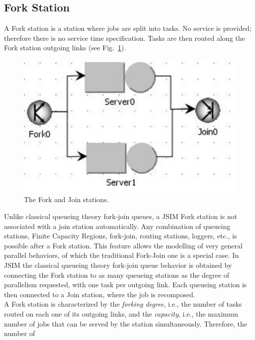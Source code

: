 \subsection{Fork Station}
\label{fstlab}
 A Fork station is a station where jobs
are split into tasks. No service is provided; therefore there is
no service time specification. Tasks are then routed along the
Fork station outgoing links (see Fig.~\ref{fig:forkprop}).\\
\begin{figure}[htb]
    \begin{center}
        \includegraphics[scale=.5]{img/jsimg/8.23.eps}
    \end{center}
    \caption{The Fork and Join stations.}
    \label{fig:forkprop}
\end{figure}
Unlike classical queueing theory fork-join queues, a JSIM Fork
station is not associated with a join station automatically. Any
combination of queueing stations, Finite Capacity Regions,
fork-join, routing stations, loggers, etc., is possible after a
Fork station. This feature allows the modelling of very general
parallel behaviors, of which the traditional Fork-Join one is a
special case. In JSIM the classical queueing theory fork-join
queue behavior is obtained by connecting the Fork station to as
many queueing stations as the degree of parallelism requested,
with one task per outgoing link. Each queueing station is then
connected to a Join station, where the job is recomposed.\\ A Fork
station is characterized by the \emph{forking degree}, i.e., the
number of tasks routed on each one of its outgoing links, and the
\emph{capacity}, i.e., the maximum number of jobs that can be
served by the station simultaneously. Therefore, the number of
